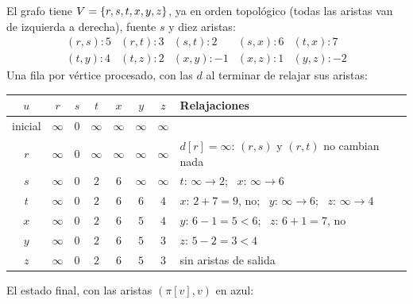 \documentclass[11pt,letterpaper]{article}
\begin{document}
\begin{ejemplo}
  \label{ej:caminos-dag-24-5}
  El grafo tiene $V = \left\{ r, s, t, x, y, z \right\}$, ya en orden
  topológico (todas las aristas van de izquierda a derecha), fuente
  $s$ y diez aristas:
  \[
    \begin{array}{lllll}
      (r, s) : 5 & (r, t) : 3 & (s, t) : 2 & (s, x) : 6
        & (t, x) : 7 \\
      (t, y) : 4 & (t, z) : 2 & (x, y) : -1 & (x, z) : 1
        & (y, z) : -2
    \end{array}
  \]
  Una fila por vértice procesado, con las $d$ al terminar de relajar
  sus aristas:
  \begin{center}
  \small
  \begin{tabular}{cccccccl}
    \toprule
    $u$ & $r$ & $s$ & $t$ & $x$ & $y$ & $z$
      & \textbf{Relajaciones} \\
    \midrule
    inicial & $\infty$ & $0$ & $\infty$ & $\infty$ & $\infty$
      & $\infty$ & \\
    $r$ & $\infty$ & $0$ & $\infty$ & $\infty$ & $\infty$ & $\infty$
      & $d[r] = \infty$: $(r, s)$ y $(r, t)$ no cambian nada \\
    $s$ & $\infty$ & $0$ & $2$ & $6$ & $\infty$ & $\infty$
      & $t$: $\infty \to 2$; \ $x$: $\infty \to 6$ \\
    $t$ & $\infty$ & $0$ & $2$ & $6$ & $6$ & $4$
      & $x$: $2 + 7 = 9$, no; \ $y$: $\infty \to 6$;
        \ $z$: $\infty \to 4$ \\
    $x$ & $\infty$ & $0$ & $2$ & $6$ & $5$ & $4$
      & $y$: $6 - 1 = 5 < 6$; \ $z$: $6 + 1 = 7$, no \\
    $y$ & $\infty$ & $0$ & $2$ & $6$ & $5$ & $3$
      & $z$: $5 - 2 = 3 < 4$ \\
    $z$ & $\infty$ & $0$ & $2$ & $6$ & $5$ & $3$
      & sin aristas de salida \\
    \bottomrule
  \end{tabular}
  \end{center}
  El estado final, con las aristas $(\pi[v], v)$ en azul:
  \begin{center}
\end{center}
\end{ejemplo}
\end{document}
